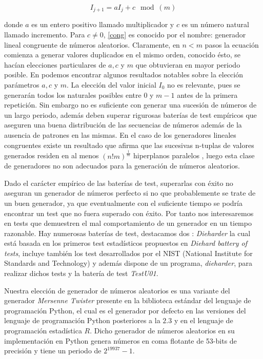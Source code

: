 \documentclass[../proyecto.tex]{memoir}
\begin{document}
\begin{equation} \label{cong}
I_{j+1} = aI_{j} +c \mod (m)
\end{equation}

donde $a$ es un entero positivo llamado multiplicador y $c$ es un número natural llamado incremento. Para $c \neq 0$, \ref{cong} es conocido por el nombre: generador lineal congruente de números aleatorios. Claramente, en $n<m$ pasos la ecuación comienza a generar valores duplicados en el mismo orden, conocido ésto, se hacían elecciones particulares de $a,c$ y $m$ que obtuvieran en mayor periodo posible. En \cite{knuth} podemos encontrar algunos resultados notables sobre la elección parámetros $a,c$ y $m$. La elección del valor inicial $I_{0}$ no es relevante, pues se generarán todos los naturales posibles entre $0$ y $m-1$ antes de la primera repetición. Sin embargo no es suficiente con generar una sucesión de números de un largo periodo, además deben superar rigurosas baterías de test empíricos que aseguren una buena distribución de las secuencias de números además de la ausencia de patrones en las mismas. En el caso de los generadores lineales congruentes existe un resultado que afirma que las sucesivas n-tuplas de valores generados residen en al menos $(n!m)^\frac{1}{m}$ hiperplanos paralelos \cite{marsagliaRandom}, luego esta clase de generadores no son adecuados para la generación de números aleatorios.

Dado el carácter empírico de las baterías de test, superarlas con éxito no aseguran un generador de números perfecto si no que probablemente se trate de un buen generador, ya que eventualmente con el suficiente tiempo se podría encontrar un test que no fuera superado con éxito. Por tanto nos interesaremos en tests que demuestren el mal comportamiento de un generador en un tiempo razonable. Hay numerosas baterías de test, destacamos dos \cite{dieharder,testu01}: \textit{Dieharder} la cual está basada en los primeros test estadísticos propuestos en \textit{Diehard battery of tests}, incluye también los test desarrollados por el NIST (National Institute for Standards and Technology) y además dispone de un programa, \textit{dieharder}, para realizar dichos tests y la batería de test \textit{TestU01}.

Nuestra elección de generador de números aleatorios es una variante del generador \textit{Mersenne Twister} \cite{mt} presente en la biblioteca estándar del lenguaje de programación Python, el cual es el generador por defecto en las versiones del lenguaje de programación Python posteriores a la $2.3$ \cite{pyver} y en el lenguaje de programación estadística $R$\cite{langR}. Dicho generador de números aleatorios en su implementación en Python genera números en coma flotante de 53-bits de precisión y tiene un periodo de $2^{19937}-1$. 
\end{document}
